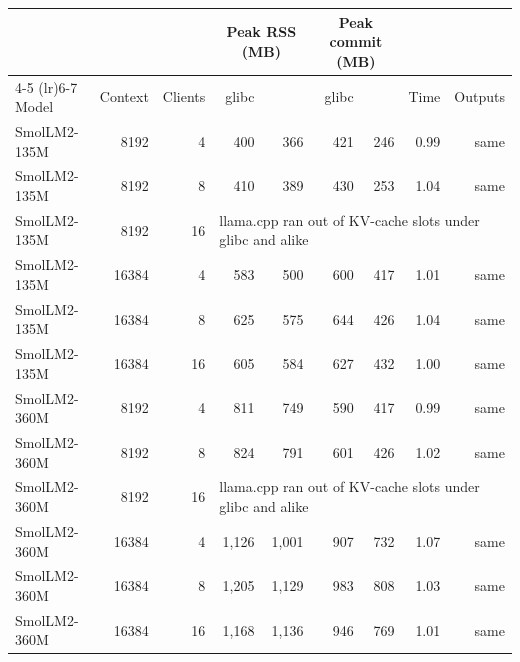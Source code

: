 \begin{tabular}{lrrrrrrrr}
\toprule
 & & & \multicolumn{2}{c}{Peak RSS (MB)} & \multicolumn{2}{c}{Peak commit (MB)} & & \\
\cmidrule(lr){4-5} \cmidrule(lr){6-7}
Model & Context & Clients & glibc & \libmpr{} & glibc & \libmpr{} & Time & Outputs \\
\midrule
SmolLM2-135M & 8192 & 4 & 400 & 366 & 421 & 246 & 0.99 & same \\
SmolLM2-135M & 8192 & 8 & 410 & 389 & 430 & 253 & 1.04 & same \\
SmolLM2-135M & 8192 & 16 & \multicolumn{6}{l}{llama.cpp ran out of KV-cache slots under glibc and \libmpr{} alike} \\
SmolLM2-135M & 16384 & 4 & 583 & 500 & 600 & 417 & 1.01 & same \\
SmolLM2-135M & 16384 & 8 & 625 & 575 & 644 & 426 & 1.04 & same \\
SmolLM2-135M & 16384 & 16 & 605 & 584 & 627 & 432 & 1.00 & same \\
SmolLM2-360M & 8192 & 4 & 811 & 749 & 590 & 417 & 0.99 & same \\
SmolLM2-360M & 8192 & 8 & 824 & 791 & 601 & 426 & 1.02 & same \\
SmolLM2-360M & 8192 & 16 & \multicolumn{6}{l}{llama.cpp ran out of KV-cache slots under glibc and \libmpr{} alike} \\
SmolLM2-360M & 16384 & 4 & 1{,}126 & 1{,}001 & 907 & 732 & 1.07 & same \\
SmolLM2-360M & 16384 & 8 & 1{,}205 & 1{,}129 & 983 & 808 & 1.03 & same \\
SmolLM2-360M & 16384 & 16 & 1{,}168 & 1{,}136 & 946 & 769 & 1.01 & same \\
\bottomrule
\end{tabular}
